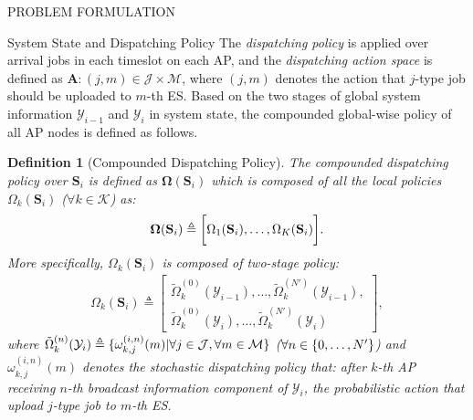 \documentclass[10pt, conference, letterpaper]{IEEEtran}
\newtheorem{definition}{Definition}
\newcommand{\define}{\triangleq}
\newcommand{\vecG}{\boldsymbol}
\DeclarePairedDelimiter{\set}{\{}{\}}
\DeclarePairedDelimiter{\Bracket}{\bigg[}{\bigg]}
\newcommand{\apSet}{\mathcal{K}}
\newcommand{\esSet}{\mathcal{M}}
\newcommand{\jSpace}{\mathcal{J}}
\newcommand{\Stat}{\mathbf{S}}
\newcommand{\Obsv}{\mathcal{Y}}
\newcommand{\Policy}{\boldsymbol{\Omega}}
\begin{document}
\begin{section}{PROBLEM FORMULATION}
\begin{subsection}{System State and Dispatching Policy}
            The \emph{dispatching policy} is applied over arrival jobs in each timeslot on each AP, and the \emph{dispatching action space} is defined as $\mathbf{A}: (j, m) \in \jSpace \times \esSet$, where $(j, m)$ denotes the action that $j$-type job should be uploaded to $m$-th ES.
            Based on the two stages of global system information $\Obsv_{i-1}$ and $\Obsv_{i}$ in system state, the compounded global-wise policy of all AP nodes is defined as follows.
            \begin{definition}[Compounded Dispatching Policy]
                The compounded dispatching policy over $\Stat_{i}$ is defined as $\Policy(\Stat_{i})$ which is composed of all the local policies $\Omega_k(\Stat_{i})$ ($\forall k\in\apSet$) as:
                \begin{align}
                    \vecG{\Omega}(\Stat_{i}) \define 
                    \Bracket{
                        \Omega_{1}(\Stat_i),
                        \dots,
                        \Omega_{K}(\Stat_i)
                    }.
                \end{align}
                More specifically, $\Omega_k(\Stat_{i})$ is composed of two-stage policy:
                \begin{align}
                    \Omega_k(\Stat_{i}) \define
                    \begin{bmatrix}
                        \tilde{\Omega}^{(0)}_k(\Obsv_{i-1}), \dots, \tilde{\Omega}^{(N')}_k(\Obsv_{i-1}),
                        \nonumber\\
                        \tilde{\Omega}^{(0)}_k(\Obsv_{i}), \dots, \tilde{\Omega}^{(N')}_k(\Obsv_{i})
                    \end{bmatrix},
                \end{align}
                where $\tilde{\Omega}^{(n)}_k(\Obsv_{i}) \define \set{\omega^{(i,n)}_{k,j}(m)|\forall j\in\jSpace, \forall m\in\esSet}$ ($\forall n\in\set{0,\dots,N'}$) and $\omega^{(i,n)}_{k,j}(m)$ denotes the stochastic dispatching policy that: after $k$-th AP receiving $n$-th broadcast information component of $\Obsv_{i}$, the probabilistic action that upload $j$-type job to $m$-th ES.
                

\end{definition}
\end{subsection}
\end{section}
\end{document}
